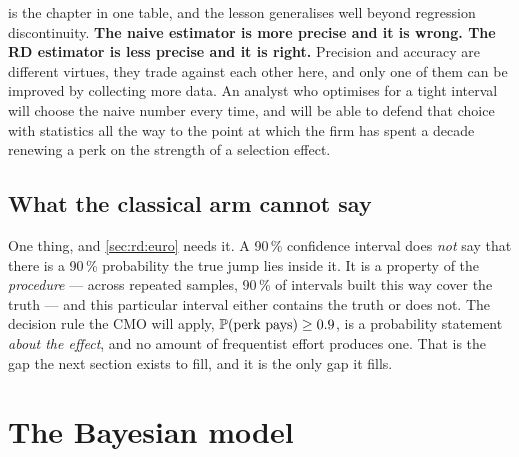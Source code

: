 

 is the chapter in one table, and the lesson generalises well beyond regression
discontinuity. \textbf{The naive estimator is more precise and it is wrong. The RD estimator is
less precise and it is right.} Precision and accuracy are different virtues, they trade against
each other here, and only one of them can be improved by collecting more data. An analyst who
optimises for a tight interval will choose the naive number every time, and will be able to defend
that choice with statistics all the way to the point at which the firm has spent a decade renewing
a perk on the strength of a selection effect.

\subsection*{What the classical arm cannot say}

One thing, and \cref{sec:rd:euro} needs it. A 90\,\% confidence interval does \emph{not} say that
there is a 90\,\% probability the true jump lies inside it. It is a property of the \emph{procedure}
--- across repeated samples, 90\,\% of intervals built this way cover the truth --- and this
particular interval either contains the truth or does not. The decision rule the CMO will apply,
$\operatorname{\mathbb{P}}(\text{perk pays}) \ge 0.9$, is a probability statement \emph{about the effect}, and no
amount of frequentist effort produces one. That is the gap the next section exists to fill, and it
is the only gap it fills.

\section{The Bayesian model}
\label{sec:rd:bayes}

